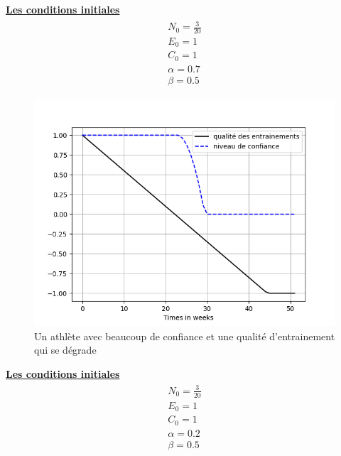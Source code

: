 \documentclass[
]{article}
\begin{document}
		\underline{\textbf{Les conditions initiales}}
		\begin{align*}
			\boxed{\begin{array}{c} N_0=\frac{3}{20} \\ E_0=1 \\
					C_0=1 \\
					\alpha=0.7 \\
					\beta=0.5
			\end{array}}
		\end{align*}
		
		\begin{figure}[H]
			\centering
			\includegraphics[width=\textwidth]{Graph4SImu1}
			\caption{Un athlète avec beaucoup de confiance et une qualité d'entrainement qui se dégrade}
			\label{fig:1_4}
		\end{figure}
		
		\underline{\textbf{Les conditions initiales}}
		\begin{align*}
			\boxed{\begin{array}{c} N_0=\frac{3}{20} \\ E_0=1 \\
					C_0=1 \\
					\alpha=0.2 \\
					\beta=0.5
			\end{array}}
		\end{align*}
		
\end{document}
